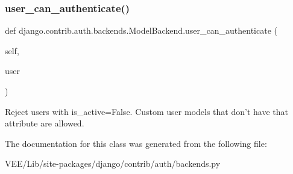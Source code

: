 \subsubsection{\texorpdfstring{user\+\_\+can\+\_\+authenticate()}{user\_can\_authenticate()}}
{\footnotesize\ttfamily def django.\+contrib.\+auth.\+backends.\+Model\+Backend.\+user\+\_\+can\+\_\+authenticate (\begin{DoxyParamCaption}\item[{}]{self,  }\item[{}]{user }\end{DoxyParamCaption})}

\begin{DoxyVerb}Reject users with is_active=False. Custom user models that don't have
that attribute are allowed.
\end{DoxyVerb}
 

The documentation for this class was generated from the following file\+:\begin{DoxyCompactItemize}
\item 
V\+E\+E/\+Lib/site-\/packages/django/contrib/auth/backends.\+py\end{DoxyCompactItemize}
